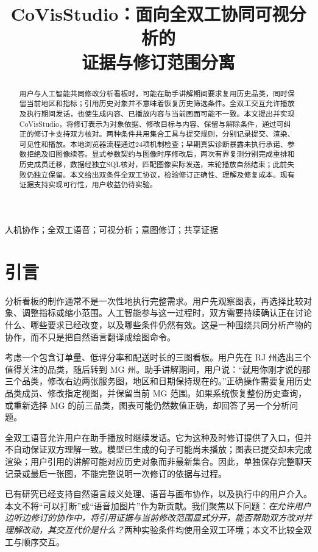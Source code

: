 \documentclass[conference]{IEEEtran}
\title{CoVisStudio：面向全双工协同可视分析的\\证据与修订范围分离}
\author{\IEEEauthorblockN{匿名作者：中文审阅稿}
\IEEEauthorblockA{方法、系统实现与初步技术验证\\正式用户对照实验尚未开展}}
\newcommand{\sys}{CoVisStudio}
\begin{document}
\maketitle

\begin{abstract}
用户与人工智能共同修改分析看板时，可能在助手讲解期间要求复用历史品类，同时保留当前地区和指标；引用历史对象并不意味着恢复历史筛选条件。全双工交互允许播放及执行期间发话，也使生成内容、已播放内容与当前画面可能不一致。本文提出并实现 \sys，将修订表示为对象依据、修改目标与内容、保留与解除条件，通过可纠正的修订卡支持双方核对。两种条件共用集合工具与提交规则，分别记录提交、渲染、可见性和播放。本地浏览器流程通过24项机制检查；早期真实诊断暴露未执行承诺、参数拒绝及旧图像续答。显式参数契约与图像时序修改后，两次有界复测分别完成重排和历史成员迁移，数据经独立SQL核对，匹配图像实际发送，末轮播放自然结束；此前失败仍独立保留。本文给出双条件全双工协议，检验修订正确性、理解及修复成本。现有证据支持实现可行性，用户收益仍待实验。
\end{abstract}
\begin{IEEEkeywords}
人机协作；全双工语音；可视分析；意图修订；共享证据
\end{IEEEkeywords}

\section{引言}
分析看板的制作通常不是一次性地执行完整需求。用户先观察图表，再选择比较对象、调整指标或缩小范围。人工智能参与这一过程时，双方需要持续确认正在讨论什么、哪些要求已经改变，以及哪些条件仍然有效。这是一种围绕共同分析产物的协作，而不只是把自然语言翻译成绘图命令。

考虑一个包含订单量、低评分率和配送时长的三图看板。用户先在 RJ 州选出三个值得关注的品类，随后转到 MG 州。助手讲解期间，用户说：“就用你刚才说的那三个品类，修改右边两张服务图，地区和日期保持现在的。”正确操作需要复用历史品类成员、修改指定视图，并保留当前 MG 范围。如果系统恢复整份历史查询，或重新选择 MG 的前三品类，图表可能仍然数值正确，却回答了另一个分析问题。

全双工语音允许用户在助手播放时继续发话。它为这种及时修订提供了入口，但并不自动保证双方理解一致。模型已生成的句子可能尚未播放；图表已提交却未完成渲染；用户引用的讲解可能对应历史对象而非最新集合。因此，单独保存完整聊天记录或最后一张图，不能完整说明一次修订的依据与过程。

已有研究已经支持自然语言歧义处理、语音与画布协作，以及执行中的用户介入\cite{datatone,cleo,voca}。本文不将“可以打断”或“语音加图片”作为新贡献。我们聚焦以下问题：\emph{在允许用户边听边修订的协作中，将引用证据与当前修改范围显式分开，能否帮助双方改对并理解改动，其交互代价是什么？}两种实验条件均使用全双工环境；本文不比较全双工与顺序交互。
\end{document}
